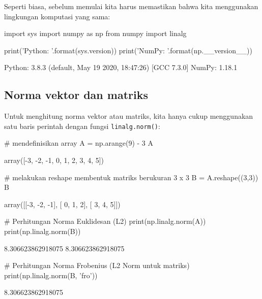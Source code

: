 Seperti biasa, sebelum memulai kita harus memastikan bahwa kita menggunakan lingkungan komputasi yang sama:

\begin{pyin}
import sys
import numpy as np
from numpy import linalg

print('Python: {}'.format(sys.version))
print('NumPy: {}'.format(np.__version__))
\end{pyin}

\begin{pyout}
Python: 3.8.3 (default, May 19 2020, 18:47:26) 
[GCC 7.3.0]
NumPy: 1.18.1
\end{pyout}

\subsection{Norma vektor dan matriks}
Untuk menghitung norma vektor atau matriks, kita hanya cukup menggunakan satu baris perintah dengan fungsi \verb|linalg.norm()|:

\begin{pyin}
# mendefinisikan array
A = np.arange(9) - 3
A
\end{pyin}

\begin{pyout}
array([-3, -2, -1,  0,  1,  2,  3,  4,  5])
\end{pyout}

\begin{pyin}
# melakukan reshape membentuk matriks berukuran 3 x 3
B = A.reshape((3,3))
B
\end{pyin}

\begin{pyout}
array([[-3, -2, -1],
       [ 0,  1,  2],
       [ 3,  4,  5]])
\end{pyout}

\begin{pyin}
# Perhitungan Norma Euklidesan (L2)
print(np.linalg.norm(A))
print(np.linalg.norm(B))
\end{pyin}

\begin{pyout}
8.306623862918075
8.306623862918075
\end{pyout}

\begin{pyin}
# Perhitungan Norma Frobenius (L2 Norm untuk matriks)
print(np.linalg.norm(B, 'fro'))
\end{pyin}

\begin{pyout}
8.306623862918075
\end{pyout}

